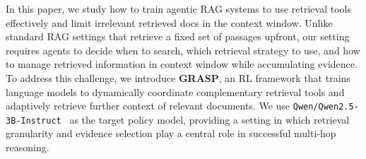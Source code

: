 \documentclass[11pt]{article}
\newcommand{\ml}[1]{\textcolor{orange}{\bf [lan: #1]}}
\begin{document}


In this paper, we study how to train agentic RAG systems to use retrieval tools effectively and limit irrelevant retrieved docs in the context window. Unlike standard RAG settings that retrieve a fixed set of passages upfront, our setting requires agents to decide when to search, which retrieval strategy to use, and how to manage retrieved information in context window while accumulating evidence. 
%
To address this challenge, we introduce \textbf{GRASP}, an RL framework that trains language models to dynamically coordinate complementary retrieval tools and adaptively retrieve further context of relevant documents. We use \texttt{Qwen/Qwen2.5-3B-Instruct}~\cite{qwen2.5} as the target policy model, providing a setting in which retrieval granularity and evidence selection play a central role in successful multi-hop reasoning.
%
\end{document}
